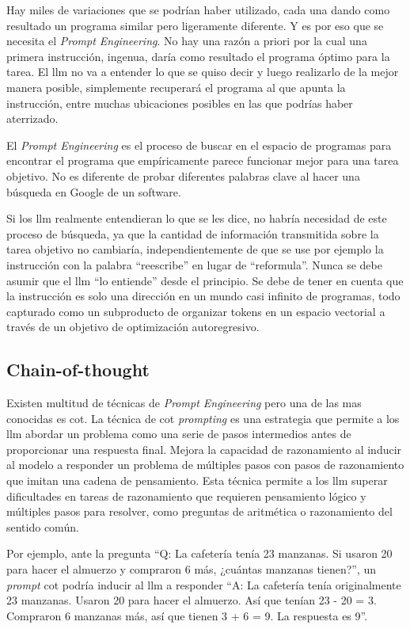 Hay miles de variaciones que se podrían haber utilizado, cada una dando como resultado un programa similar pero ligeramente diferente. Y es por eso que se necesita el \textit{Prompt Engineering}. No hay una razón a priori por la cual una primera instrucción, ingenua, daría como resultado el programa óptimo para la tarea. El \acrshort{llm} no va a entender lo que se quiso decir y luego realizarlo de la mejor manera posible, simplemente recuperará el programa al que apunta la instrucción, entre muchas ubicaciones posibles en las que podrías haber aterrizado.

El \textit{Prompt Engineering} es el proceso de buscar en el espacio de programas para encontrar el programa que empíricamente parece funcionar mejor para una tarea objetivo. No es diferente de probar diferentes palabras clave al hacer una búsqueda en Google de un software.

Si los \acrshort{llm} realmente entendieran lo que se les dice, no habría necesidad de este proceso de búsqueda, ya que la cantidad de información transmitida sobre la tarea objetivo no cambiaría, independientemente de que se use por ejemplo la instrucción con la palabra ``reescribe'' en lugar de ``reformula''. Nunca se debe asumir que el \acrshort{llm} ``lo entiende'' desde el principio. Se debe de tener en cuenta que la instrucción es solo una dirección en un mundo casi infinito de programas, todo capturado como un subproducto de organizar tokens en un espacio vectorial a través de un objetivo de optimización autoregresivo.

\subsection{Chain-of-thought}

Existen multitud de técnicas de \textit{Prompt Engineering} pero una de las mas conocidas es \acrfull{cot}. La técnica de \acrlong{cot} \textit{prompting} es una estrategia que permite a los \acrshort{llm} abordar un problema como una serie de pasos intermedios antes de proporcionar una respuesta final. Mejora la capacidad de razonamiento al inducir al modelo a responder un problema de múltiples pasos con pasos de razonamiento que imitan una cadena de pensamiento. Esta técnica permite a los \acrshort{llm} superar dificultades en tareas de razonamiento que requieren pensamiento lógico y múltiples pasos para resolver, como preguntas de aritmética o razonamiento del sentido común.

Por ejemplo, ante la pregunta ``Q: La cafetería tenía 23 manzanas. Si usaron 20 para hacer el almuerzo y compraron 6 más, ¿cuántas manzanas tienen?'', un \textit{prompt} \acrshort{cot} podría inducir al \acrshort{llm} a responder ``A: La cafetería tenía originalmente 23 manzanas. Usaron 20 para hacer el almuerzo. Así que tenían 23 - 20 = 3. Compraron 6 manzanas más, así que tienen 3 + 6 = 9. La respuesta es 9''\cite{wei2023chainofthought}.

